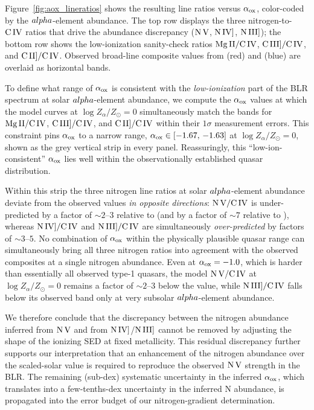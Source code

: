 Figure~\ref{fig:aox_lineratios} shows the resulting line ratios versus
$\alpha_{\rm ox}$, color-coded by the $\\alpha$-element abundance.  The top row
displays the three nitrogen-to-$\rm C\,IV$ ratios that drive the
abundance discrepancy ($\rm N\,V$, $\rm N\,IV]$, $\rm N\,III]$); the
bottom row shows the low-ionization sanity-check ratios
$\rm Mg\,II/C\,IV$, $\rm C\,III]/C\,IV$, and $\rm C\,II]/C\,IV$.  Observed
broad-line composite values from \citet{VandenBerk2001} (red) and
\citet{constantin2003} (blue) are overlaid as horizontal bands.

To define what range of $\alpha_{\rm ox}$ is consistent with the
\emph{low-ionization} part of the BLR spectrum at solar $\\alpha$-element abundance, we
compute the $\alpha_{\rm ox}$ values at which the model curves at
$\log Z_{\alpha}/Z_{\odot} = 0$ simultaneously match the
\citet{VandenBerk2001} bands for $\rm Mg\,II/C\,IV$, $\rm C\,III]/C\,IV$, and
$\rm C\,II]/C\,IV$ within their $1\sigma$ measurement errors.  This
constraint pins $\alpha_{\rm ox}$ to a narrow range,
$\alpha_{\rm ox} \in [-1.67,\,-1.63]$ at $\log Z_{\alpha}/Z_{\odot} = 0$, shown
as the grey vertical strip in every panel.  Reassuringly, this
``low-ion-consistent'' $\alpha_{\rm ox}$ lies well within the
observationally established quasar distribution.

Within this strip the three nitrogen line ratios at solar $\\alpha$-element abundance
deviate from the observed values \emph{in opposite directions}:
$\rm N\,V/C\,IV$ is under-predicted by a factor of $\sim2$--$3$ relative
to \citet{VandenBerk2001} (and by a factor of $\sim7$ relative to
\citet{constantin2003}), whereas $\rm N\,IV]/C\,IV$ and
$\rm N\,III]/C\,IV$ are simultaneously \emph{over-predicted} by factors
of $\sim3$--$5$.  No combination of $\alpha_{\rm ox}$ within the
physically plausible quasar range can simultaneously bring all three
nitrogen ratios into agreement with the observed composites at a single
nitrogen abundance.  Even at $\alpha_{\rm ox} = -1.0$, which is harder
than essentially all observed type-1 quasars, the model
$\rm N\,V/C\,IV$ at $\log Z_{\alpha}/Z_{\odot} = 0$ remains a factor of
$\sim 2$--$3$ below the \citet{VandenBerk2001} value, while $\rm N\,III]/C\,IV$
falls below its observed band only at very subsolar $\\alpha$-element abundance.

We therefore conclude that the discrepancy between the nitrogen
abundance inferred from $\rm N\,V$ and from $\rm N\,IV]$/$\rm N\,III]$
cannot be removed by adjusting the shape of the ionizing SED at fixed
metallicity.  This residual discrepancy further supports our
interpretation that an enhancement of the nitrogen abundance over the
scaled-solar value is required to reproduce the observed $\rm N\,V$
strength in the BLR.  The remaining (sub-dex) systematic uncertainty in
the inferred $\alpha_{\rm ox}$, which translates into a few-tenths-dex
uncertainty in the inferred N abundance, is propagated into the error
budget of our nitrogen-gradient determination.

